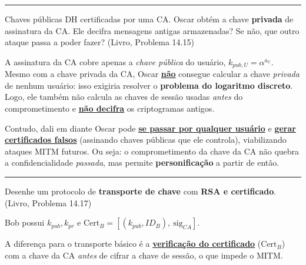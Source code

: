 \documentclass[11pt,a4paper]{article}
\newcommand{\livro}[1]{{\footnotesize\color{black!50}(Livro, Problema #1)}}
\newcommand{\alert}[1]{\textbf{\uline{#1}}}
\newcommand{\exercicio}[1]{%
    \Needspace{8\baselineskip}%
    \par\vspace{1.2em}
    \noindent
    {\color{black!55}\rule[-0.25em]{3pt}{1.6em}}%
    \hspace{0.6em}{\Large\bfseries Exerc\'{i}cio #1}
    \par\vspace{-0.4em}
    \noindent{\color{black!35}\rule{\textwidth}{0.4pt}}
    \par\vspace{0.35em}
}
\newenvironment{resposta}{%
    \begin{respostabox}
    \color{red!70!black}\sloppy
}{%
    \end{respostabox}
}
\begin{document}
\exercicio{8}
Chaves p\'{u}blicas DH certificadas por uma CA. Oscar obt\'{e}m a chave \textbf{privada} de assinatura da CA. Ele decifra mensagens antigas armazenadas? Se n\~{a}o, que outro ataque passa a poder fazer? \livro{14.15}
\begin{resposta}
A assinatura da CA cobre apenas a \emph{chave p\'{u}blica} do usu\'{a}rio, $k_{pub,U} = \alpha^{a_U}$. Mesmo com a chave privada da CA, Oscar \alert{n\~{a}o} consegue calcular a chave \emph{privada} de nenhum usu\'{a}rio: isso exigiria resolver o \textbf{problema do logaritmo discreto}. Logo, ele tamb\'{e}m n\~{a}o calcula as chaves de sess\~{a}o usadas \emph{antes} do comprometimento e \alert{n\~{a}o decifra} os criptogramas antigos.

Contudo, dali em diante Oscar pode \alert{se passar por qualquer usu\'{a}rio} e \alert{gerar certificados falsos} (assinando chaves p\'{u}blicas que ele controla), viabilizando ataques MITM futuros. Ou seja: o comprometimento da chave da CA n\~{a}o quebra a confidencialidade \emph{passada}, mas permite \textbf{personifica\c{c}\~{a}o} a partir de ent\~{a}o.
\end{resposta}

\exercicio{9}
Desenhe um protocolo de \textbf{transporte de chave} com \textbf{RSA e certificado}. \livro{14.17}
\begin{resposta}
Bob possui $k_{pub}, k_{pr}$ e $\text{Cert}_B = [(k_{pub}, ID_B),\ \mathrm{sig}_{CA}]$.
\begin{center}{\color{black}
}
\end{center}
A diferen\c{c}a para o transporte b\'{a}sico \'{e} a \alert{verifica\c{c}\~{a}o do certificado} ($\text{Cert}_B$) com a chave da CA \emph{antes} de cifrar a chave de sess\~{a}o, o que impede o MITM.
\end{resposta}
\end{document}
